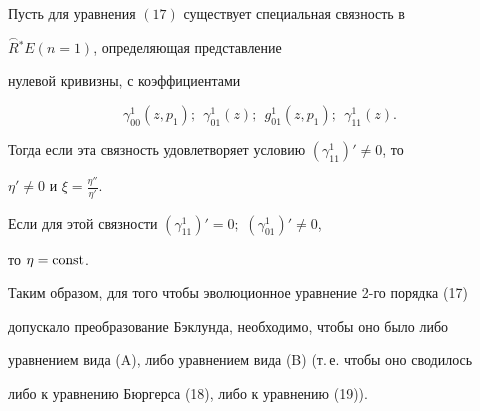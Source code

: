 \begin{lems}


Пусть для уравнения $(17)$ существует специальная связность в


$\overset{\frown}{R}{}^*E ({n=1})$, определяющая представление 


нулевой кривизны, с коэффициентами


$$


\gamma_{00}^1 ({z,p_1});\ \ \gamma_{01}^1 (z);\ \ g_{01}^1 ({z,p_1});


\ \ \gamma_{11}^1 (z).


$$


Тогда если эта связность удовлетворяет условию $ ({\gamma_{11}^1})' \ne 0$, то


$\eta' \ne 0$  и $\xi=\frac{{\eta''}}{{\eta'}}$.





Если для этой связности $ ({\gamma_{11}^1})'=0;$ $ ({\gamma_{01}^1})' \ne 0$,


то $\eta=\operatorname{const}$.


\end{lems}





Таким образом, для того чтобы эволюционное уравнение 2-го порядка (17) 


допускало преобразование Бэклунда, необходимо, чтобы оно было либо 


уравнением вида (A), либо уравнением вида (B) (т.\,е. чтобы оно сводилось 


либо к уравнению Бюргерса (18), либо к уравнению (19)).





